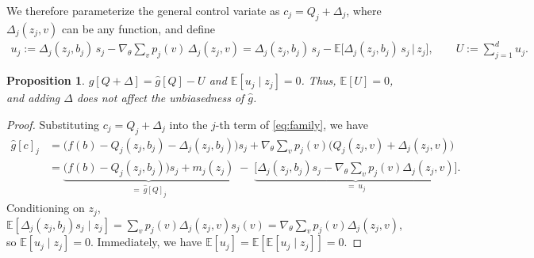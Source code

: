 \documentclass[10pt]{article}
\providecommand{\E}{\mathbb{E}}
\theoremstyle{plain}
\newtheorem{proposition}[theorem]{Proposition}
\theoremstyle{definition}
\theoremstyle{remark}
\theoremstyle{definition}
\newcommand{\ctx}[1]{z_{#1}}                 %
\newcommand{\score}[1]{s_{#1}}               %
\newcommand{\ghat}[1]{\hat g[#1]}            %
\newcommand{\pj}[1]{p_{#1}}                  %
\begin{document}
We therefore parameterize the general control variate as $c_j=Q_j+\Delta_j$, where $\Delta_j(\ctx{j},v)$ can be any function, and define
\begin{align}\label{eq:uj}
    u_j := \Delta_j(\ctx{j},b_j)\,\score{j} - \nabla_\theta\sum_v\pj{j}(v)\,\Delta_j(\ctx{j},v)
    = \Delta_j(\ctx{j},b_j)\,\score{j} - \E\big[\Delta_j(\ctx{j},b_j)\,\score{j}\,\big|\,\ctx{j}\big],
    \qquad U:=\sum_{j=1}^{d}u_j .
\end{align}

\begin{proposition}\label{prop:unbiased-pert}
    $\ghat{Q+\Delta}=\ghat{Q}-U$ and $\E[u_j\mid\ctx{j}]=0$. Thus, $\E[U]=0$, and adding $\Delta$ does not affect the unbiasedness of $\hat g$.
\end{proposition}
\begin{proof}
    Substituting $c_j=Q_j+\Delta_j$ into the $j$-th term of \eqref{eq:family}, we have
    \begin{align}
        \ghat{c}_j &=\big(f(b) - Q_j(\ctx{j},b_j) - \Delta_j(\ctx{j},b_j)\big)\score{j} + \nabla_\theta\sum_v\pj{j}(v)\big(Q_j(\ctx{j},v)+\Delta_j(\ctx{j},v)\big) \\
        &=\underbrace{\big(f(b) - Q_j(\ctx{j},b_j)\big)\score{j} + m_j(\ctx{j})}_{=\ \ghat{Q}_j}
        \;-\;\underbrace{\Big[\Delta_j(\ctx{j},b_j)\score{j} - \nabla_\theta\sum_v\pj{j}(v)\Delta_j(\ctx{j},v)\Big]}_{=\ u_j}.
    \end{align}
    Conditioning on $\ctx{j}$, $\E[\Delta_j(\ctx{j},b_j)\score{j}\mid\ctx{j}]=\sum_v\pj{j}(v)\Delta_j(\ctx{j},v)\score{j}(v)=\nabla_\theta\sum_v\pj{j}(v)\Delta_j(\ctx{j},v)$, so $\E[u_j\mid\ctx{j}]=0$. Immediately, we have $\E[u_j]=\E[\E[u_j\mid\ctx{j}]]=0$.
\end{proof}
\end{document}
